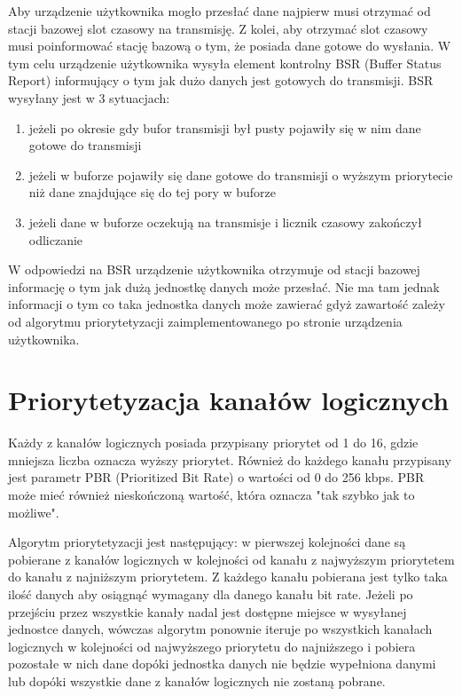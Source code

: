Aby urządzenie użytkownika mogło przesłać dane najpierw musi otrzymać od stacji bazowej slot czasowy na transmisję. Z kolei, aby otrzymać slot czasowy musi poinformować stację bazową o tym, że posiada dane gotowe do wysłania. W tym celu urządzenie użytkownika wysyła element kontrolny BSR (Buffer Status Report) informujący o tym jak dużo danych jest gotowych do transmisji. BSR wysyłany jest w 3 sytuacjach:

\begin{enumerate}
	\item jeżeli po okresie gdy bufor transmisji był pusty pojawiły się w nim dane gotowe do transmisji
	\item jeżeli w buforze pojawiły się dane gotowe do transmisji o wyższym priorytecie niż dane znajdujące się do tej pory w buforze
	\item jeżeli dane w buforze oczekują na transmisje i licznik czasowy zakończył odliczanie
\end{enumerate}

W odpowiedzi na BSR urządzenie użytkownika otrzymuje od stacji bazowej informację o tym jak dużą jednostkę danych może przesłać. Nie ma tam jednak informacji o tym co taka jednostka danych może zawierać gdyż zawartość zależy od algorytmu priorytetyzacji zaimplementowanego po stronie urządzenia użytkownika.

\section{Priorytetyzacja kanałów logicznych}

Każdy z kanałów logicznych posiada przypisany priorytet od 1 do 16, gdzie mniejsza liczba oznacza wyższy priorytet. Również do każdego kanału przypisany jest parametr PBR (Prioritized Bit Rate) o wartości od 0 do 256 kbps. PBR może mieć również nieskończoną wartość, która oznacza "tak szybko jak to możliwe".

Algorytm priorytetyzacji jest następujący: w pierwszej kolejności dane są pobierane z kanałów logicznych w kolejności od kanału z najwyższym priorytetem do kanału z najniższym priorytetem. Z każdego kanału pobierana jest tylko taka ilość danych aby osiągnąć wymagany dla danego kanału bit rate. Jeżeli po przejściu przez wszystkie kanały nadal jest dostępne miejsce w wysyłanej jednostce danych, wówczas algorytm ponownie iteruje po wszystkich kanałach logicznych w kolejności od najwyższego priorytetu do najniższego i pobiera pozostałe w nich dane dopóki jednostka danych nie będzie wypełniona danymi lub dopóki wszystkie dane z kanałów logicznych nie zostaną pobrane.

